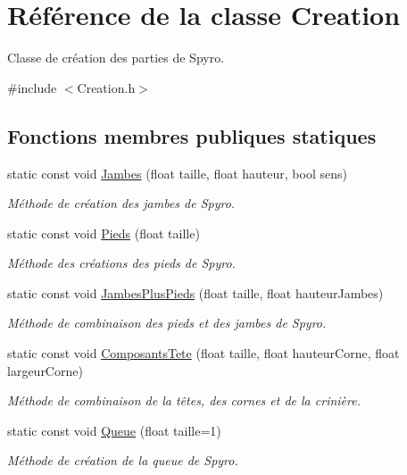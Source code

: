 \hypertarget{class_creation}{}\section{Référence de la classe Creation}
\label{class_creation}


Classe de création des parties de Spyro.  




{\ttfamily \#include $<$Creation.\+h$>$}

\subsection*{Fonctions membres publiques statiques}
\begin{DoxyCompactItemize}
\item 
static const void \hyperlink{class_creation_a2d1daa4216248756a6f281842fb2b539}{Jambes} (float taille, float hauteur, bool sens)
\begin{DoxyCompactList}\small\item\em Méthode de création des jambes de Spyro. \end{DoxyCompactList}\item 
static const void \hyperlink{class_creation_a6a59d7a08c123b17c4ff92075905b3ff}{Pieds} (float taille)
\begin{DoxyCompactList}\small\item\em Méthode des créations des pieds de Spyro. \end{DoxyCompactList}\item 
static const void \hyperlink{class_creation_ab6f85650fcec40bb6cb8a4639e260016}{Jambes\+Plus\+Pieds} (float taille, float hauteur\+Jambes)
\begin{DoxyCompactList}\small\item\em Méthode de combinaison des pieds et des jambes de Spyro. \end{DoxyCompactList}\item 
static const void \hyperlink{class_creation_a8f30640c61b4acf8689e08846cf63fdc}{Composants\+Tete} (float taille, float hauteur\+Corne, float largeur\+Corne)
\begin{DoxyCompactList}\small\item\em Méthode de combinaison de la têtes, des cornes et de la crinière. \end{DoxyCompactList}\item 
static const void \hyperlink{class_creation_ab24fb518c272fa8f2a54fd57ec57c2c9}{Queue} (float taille=1)
\begin{DoxyCompactList}\small\item\em Méthode de création de la queue de Spyro. \end{DoxyCompactList}\end{DoxyCompactItemize}


